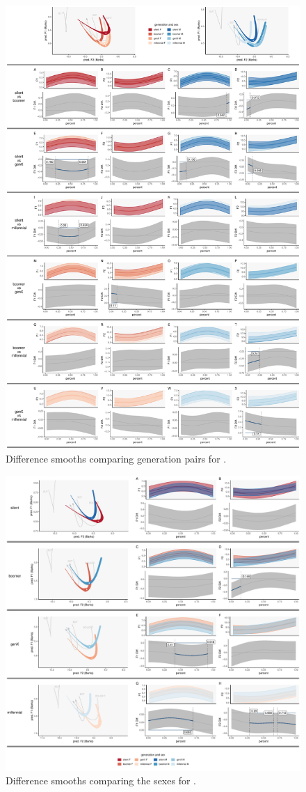 \begin{figure}[p]
    \centering
    \includegraphics[width=\textwidth]{Figures/BOUGHT/BOUGHT_detailed_generation_panel_plot.pdf}
    \caption{Difference smooths comparing generation pairs for \thought.}
    \label{fig:bought_diff_smooths_gen}
\end{figure}

\begin{figure}[p]
    \centering
    \includegraphics[width=\textwidth]{Figures/BOUGHT/BOUGHT_sex_panel_plot.pdf}
    \caption{Difference smooths comparing the sexes for \thought.}
    \label{fig:bought_diff_smooths_sex_gen}
\end{figure}
